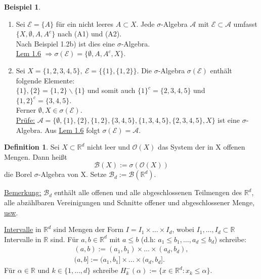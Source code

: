\documentclass[a4paper]{scrreprt}
\newcommand{\R}{\mathbb{R}}
\newcommand{\Borel}{\mathcal{B}}
\newcommand{\Bd}{\Borel_d}
\newcommand{\jlabel}[1]{\label{j_#1}}
\newcommand{\jhyperref}[2]{\hyperref[j_#1]{#2}}
\newcommand{\jlink}[1]{\jhyperref{#1}{#1}}
\theoremstyle{plain}
\theoremstyle{definition}
\newtheorem{defn}[thm]{Definition}
\newtheorem{expl}[thm]{Beispiel}
\begin{document}
\jlabel{Bsp 1.7}
\begin{expl}
    \begin{enumerate}
        \item 
            Sei $\mathcal{E} = \{A\}$ für ein nicht leeres $A \subset X$. Jede $\sigma$-Algebra $\mathcal{A}$ mit $\mathcal{E} \subset \mathcal{A}$ umfasst $\{X, \emptyset, A, A^c\}$ nach (A1) und (A2).\\
            Nach Beispiel 1.2b) ist dies eine $\sigma$-Algebra.\\
            \jlink{Lem 1.6} $\Rightarrow \sigma(\mathcal{E}) = \{\emptyset, A, A^c, X\}$.
        \item
            Sei $X = \{1,2,3,4,5\},\ \mathcal{E} = \{\{1\}, \{1,2\}\}$. Die $\sigma$-Algebra $\sigma(\mathcal{E})$ enthält folgende Elemente:\\
            $\{1\}, \{2\}= \{1,2\} \backslash \{1\}$ und somit auch $\{1\}^c = \{2,3,4,5\}$ und $\{1,2\}^c = \{3,4,5\}$.\\
            Ferner $\emptyset, X \in \sigma(\mathcal{E})$.\\
            \uline{Prüfe:} $\mathcal{A} = \{\emptyset, \{1\}, \{2\}, \{1,2\}, \{3,4,5\}, \{1,3,4,5\}, \{2,3,4,5\}, X\}$ ist eine $\sigma$-Algebra. Aus \jlink{Lem 1.6} folgt $\sigma(\mathcal{E})=\mathcal{A}$.
    \end{enumerate}
\end{expl}


\begin{defn}
\jlabel{Def 1.8}
    Sei $X \subset \R^d$ nicht leer und $\mathcal{O}(X)$ das System der in X offenen Mengen. Dann heißt 
    \begin{displaymath}
        \Borel(X) := \sigma(\mathcal{O}(X))
    \end{displaymath}
    die Borel $\sigma$-Algebra von X. Setze $\Bd := \Borel(\R^d)$.
    
    \vspace{12pt}
    
    \uline{Bemerkung:} $\Bd$ enthält alle offenen und alle abgeschlossenen Teilmengen des $\R^d$, alle abzählbaren Vereinigungen und Schnitte offener und abgeschlossener Menge, \uline{usw}.
\end{defn}
\uline{Intervalle} in $\R^d$ sind Mengen der Form $I = I_1 \times \dots \times I_d$, wobei $I_1, \dots, I_d \subset \R$ Intervalle in $\R$ sind. Für $a, b \in \R^d$ mit $a \le b$ (d.h: $a_1 \le b_1, \dots, a_d \le b_d$) schreibe:
\begin{displaymath}
    \begin{split}
        (a,b) := (a_1, b_1) \times \dots \times (a_d, b_d),\\
        (a,b] := (a_1, b_1] \times \dots \times (a_d, b_d].
    \end{split}
\end{displaymath}
Für $\alpha \in \R$ und $k \in \{1,\dots,d\}$ schreibe $H_k^-(\alpha) := \{x \in \R^d: x_k \le \alpha\}$.
\end{document}
